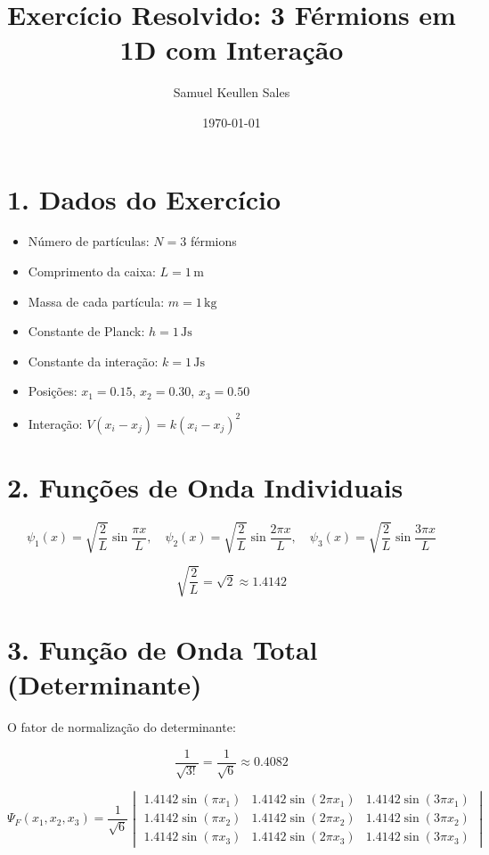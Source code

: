 \documentclass[12pt,a4paper]{article}
\title{Exercício Resolvido: 3 Férmions em 1D com Interação}
\author{Samuel Keullen Sales}
\date{\today}
\begin{document}
\maketitle

\section*{1. Dados do Exercício}

\begin{itemize}
    \item Número de partículas: \(N = 3\) férmions
    \item Comprimento da caixa: \(L = 1\,\mathrm{m}\)
    \item Massa de cada partícula: \(m = 1\,\mathrm{kg}\)
    \item Constante de Planck: \(h = 1\,\mathrm{Js}\)
    \item Constante da interação: \(k = 1\,\mathrm{Js}\)
    \item Posições: \(x_1 = 0.15\), \(x_2 = 0.30\), \(x_3 = 0.50\)
    \item Interação: \(V(x_i - x_j) = k (x_i - x_j)^2\)
\end{itemize}

\section*{2. Funções de Onda Individuais}

\[
\psi_1(x) = \sqrt{\frac{2}{L}} \sin\frac{\pi x}{L}, \quad
\psi_2(x) = \sqrt{\frac{2}{L}} \sin\frac{2 \pi x}{L}, \quad
\psi_3(x) = \sqrt{\frac{2}{L}} \sin\frac{3 \pi x}{L}
\]

\[
\sqrt{\frac{2}{L}} = \sqrt{2} \approx 1.4142
\]

\section*{3. Função de Onda Total (Determinante)}

O fator de normalização do determinante:

\[
\frac{1}{\sqrt{3!}} = \frac{1}{\sqrt{6}} \approx 0.4082
\]

\[
\Psi_F(x_1,x_2,x_3) = \frac{1}{\sqrt{6}}
\begin{vmatrix}
1.4142 \sin(\pi x_1) & 1.4142 \sin(2\pi x_1) & 1.4142 \sin(3\pi x_1) \\
1.4142 \sin(\pi x_2) & 1.4142 \sin(2\pi x_2) & 1.4142 \sin(3\pi x_2) \\
1.4142 \sin(\pi x_3) & 1.4142 \sin(2\pi x_3) & 1.4142 \sin(3\pi x_3)
\end{vmatrix}
\]
\end{document}
